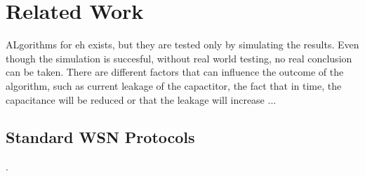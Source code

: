 \normalfont\normalsize
\chapter{Related Work}
\label{chap:related}

ALgorithms for eh exists, but they are tested only by simulating the results. Even though the
simulation is succesful, without real world testing, no real conclusion can be taken. There are
different factors that can influence the outcome of the algorithm, such as current leakage of the
capactitor, the fact that in time, the capacitance will be reduced or that the leakage will
increase ...

\section{Standard WSN Protocols}


\cite{teh2008experiments} .


